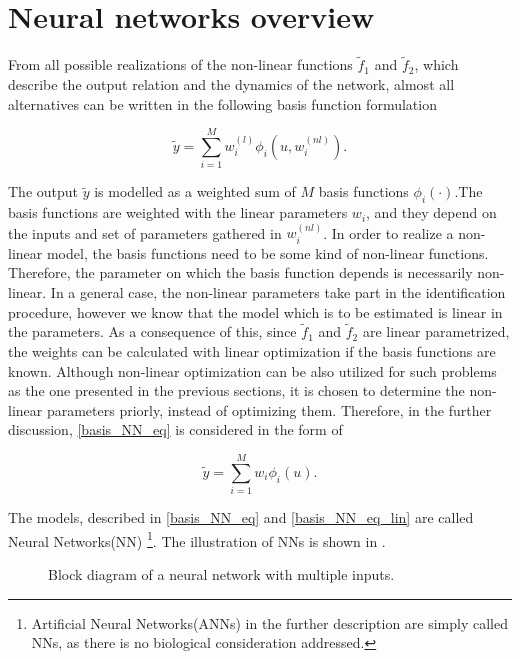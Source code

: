 
\chapter{Neural networks overview}
\label{neural_networks}

From all possible realizations of the non-linear functions $\tilde{f}_1$ and $\tilde{f}_2$, which describe the output relation and the dynamics of the network, almost all alternatives can be written in the following basis function formulation \cite{norgaard2003neural}

\begin{equation}
\label{basis_NN_eq}
\tilde{y} = \sum_{i = 1}^M w^{(l)}_i \phi_i(u, w^{(nl)}_i).
\end{equation}

The output $\tilde{y}$ is modelled as a weighted sum of $M$ basis functions $\phi_i(\cdot)$.The basis functions are weighted with the linear parameters $w_i$, and they depend on the inputs and set of parameters gathered in $w^{(nl)}_i$. In order to realize a non-linear model, the basis functions need to be some kind of non-linear functions. Therefore, the parameter on which the basis function depends is necessarily non-linear. In a general case, the non-linear parameters take part in the identification procedure, however we know that the model which is to be estimated is linear in the parameters. As a consequence of this, since $\tilde{f}_1$ and $\tilde{f}_2$ are linear parametrized, the weights can be calculated with linear optimization if the basis functions are known. Although non-linear optimization can be also utilized for such problems as the one presented in the previous sections, it is chosen to determine the non-linear parameters priorly, instead of optimizing them. Therefore, in the further discussion, \eqref{basis_NN_eq} is considered in the form of

 \begin{equation}
\label{basis_NN_eq_lin}
\tilde{y} = \sum_{i = 1}^M w_i \phi_i(u).
\end{equation}

The models, described in \eqref{basis_NN_eq} and \eqref{basis_NN_eq_lin} are called Neural Networks(NN) \footnote{Artificial Neural Networks(ANNs) in the further description are simply called NNs, as there is no biological consideration addressed.}. The illustration of NNs is shown in .

\begin{figure}[H]
\centering
 
\caption{Block diagram of a neural network with multiple inputs.}
\label{fig:nn_example_block}
\end{figure}


